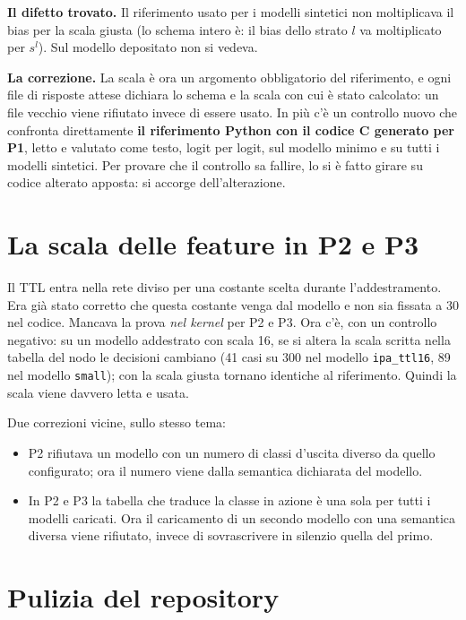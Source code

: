 \documentclass[11pt,a4paper,oneside]{report}
\begin{document}
\textbf{Il difetto trovato.} Il riferimento usato per i modelli sintetici non
moltiplicava il bias per la scala giusta (lo schema intero è: il bias dello strato
$l$ va moltiplicato per $s^l$). Sul modello depositato non si vedeva.

\textbf{La correzione.} La scala è ora un argomento obbligatorio del riferimento, e
ogni file di risposte attese dichiara lo schema e la scala con cui è stato
calcolato: un file vecchio viene rifiutato invece di essere usato. In più c'è un
controllo nuovo che confronta direttamente \textbf{il riferimento Python con il
codice C generato per P1}, letto e valutato come testo, logit per logit, sul
modello minimo e su tutti i modelli sintetici. Per provare che il controllo sa
fallire, lo si è fatto girare su codice alterato apposta: si accorge
dell'alterazione.

\section{La scala delle feature in P2 e P3}

Il TTL entra nella rete diviso per una costante scelta durante l'addestramento.
Era già stato corretto che questa costante venga dal modello e non sia fissata a
30 nel codice. Mancava la prova \emph{nel kernel} per P2 e P3. Ora c'è, con un
controllo negativo: su un modello addestrato con scala 16, se si altera la scala
scritta nella tabella del nodo le decisioni cambiano (41 casi su 300 nel modello
\texttt{ipa\_ttl16}, 89 nel modello \texttt{small}); con la scala giusta tornano
identiche al riferimento. Quindi la scala viene davvero letta e usata.

Due correzioni vicine, sullo stesso tema:
\begin{itemize}
  \item P2 rifiutava un modello con un numero di classi d'uscita diverso da quello
        configurato; ora il numero viene dalla semantica dichiarata del modello.
  \item In P2 e P3 la tabella che traduce la classe in azione è una sola per tutti
        i modelli caricati. Ora il caricamento di un secondo modello con una
        semantica diversa viene rifiutato, invece di sovrascrivere in silenzio
        quella del primo.
\end{itemize}

\section{Pulizia del repository}
\end{document}

